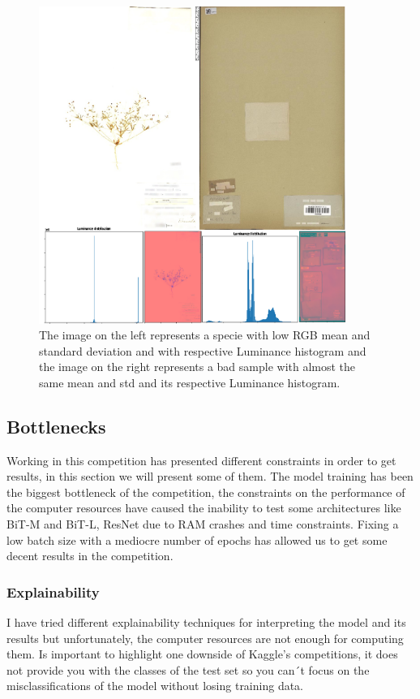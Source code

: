 \documentclass{article}
\begin{document}
\begin{figure}[h]
    \centering
    \includegraphics[width=10cm]{badsamples}
    \caption{The image on the left represents a specie with low RGB mean and standard deviation and with respective Luminance histogram and the image on the right represents a bad sample with almost the same mean and std and its respective Luminance histogram.}
    \label{fig:badsamples}

\end{figure}

\subsection{Bottlenecks}
Working in this competition has presented different constraints in order to get results, in this section we will present some of them. The model training has been the biggest bottleneck of the competition, the constraints on the performance of the computer resources have caused the inability to test some architectures like BiT-M and BiT-L, ResNet due to RAM crashes and time constraints. Fixing a low batch size with a mediocre number of epochs has allowed us to get some decent results in the competition.

 \subsubsection{Explainability}
I have tried different explainability techniques for interpreting the model and its results but unfortunately, the computer resources are not enough for computing them. Is important to highlight one downside of Kaggle’s competitions, it does not provide you with the classes of the test set so you can´t focus on the misclassifications of the model without losing training data. 
\end{document}
